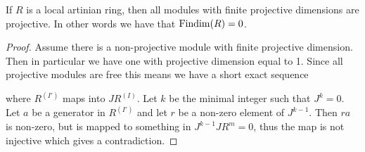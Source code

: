 \begin{theorem}\label{thm:local_artin_ring_Findim_0}
	If $R$ is a local artinian ring, then all modules with finite projective dimensions are projective. In other words we have that $\operatorname{Findim}(R) = 0$.
	\begin{proof}
		Assume there is a non-projective module with finite projective dimension. Then in particular we have one with projective dimension equal to 1. Since all projective modules are free this means we have a short exact sequence
		\begin{center}
		\end{center}
		where $R^{(I')}$ maps into $JR^{(I)}$. Let $k$ be the minimal integer such that $J^k=0$. Let $a$ be a generator in $R^{(I')} $ and let $r$ be a non-zero element of $J^{k-1}$. Then $ra$ is non-zero, but is mapped to something in $J^{k-1}JR^m=0$, thus the map is not injective which gives a contradiction. 
	\end{proof}
\end{theorem}

